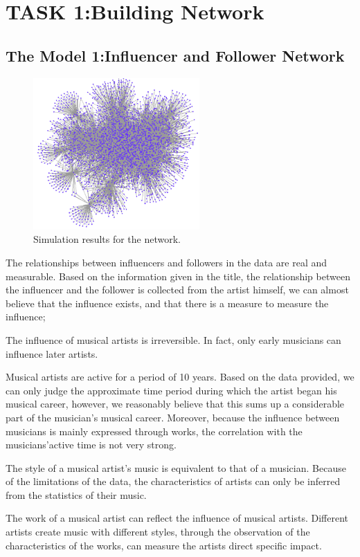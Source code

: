 \documentclass[conference]{IEEEtran}
\begin{document}
\section{TASK 1:Building Network}

\subsection{The Model 1:Influencer and Follower Network}

\begin{figure}[t]
	\centering
	\includegraphics[width=2.5in]{./img/large_network}
	\caption{Simulation results for the network.}
\end{figure}
The relationships between influencers and followers in the data are real and measurable. Based on the information given in the title, the relationship between the influencer and the follower is collected from the artist himself, we can almost believe that the influence exists, and that there is a measure to measure the influence;

The influence of musical artists is irreversible. In fact, only early musicians can influence later artists.

Musical artists are active for a period of 10 years. Based on the data provided, we can only judge the approximate time period during which the artist began his musical career, however, we reasonably believe that this sums up a considerable part of the musician’s musical career. Moreover, because the influence between musicians is mainly expressed through works, the correlation with the musicians’active time is not very strong.

The style of a musical artist’s music is equivalent to that of a musician. Because of the limitations of the data, the characteristics of artists can only be inferred from the statistics of their music.

The work of a musical artist can reflect the influence of musical artists. Different artists create music with different styles, through the observation of the characteristics of the works, can measure the artists direct specific impact.
\end{document}
